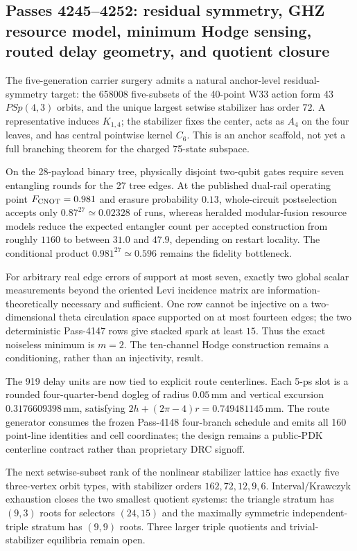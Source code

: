 \subsection*{Passes 4245--4252: residual symmetry, GHZ resource model, minimum Hodge sensing, routed delay geometry, and quotient closure}
The five-generation carrier surgery admits a natural anchor-level residual-symmetry target: the 658008 five-subsets of the 40-point W33 action form 43 $PSp(4,3)$ orbits, and the unique largest setwise stabilizer has order $72$.  A representative induces $K_{1,4}$; the stabilizer fixes the center, acts as $A_4$ on the four leaves, and has central pointwise kernel $C_6$.  This is an anchor scaffold, not yet a full branching theorem for the charged 75-state subspace.

On the 28-payload binary tree, physically disjoint two-qubit gates require seven entangling rounds for the 27 tree edges.  At the published dual-rail operating point $F_{\rm CNOT}=0.981$ and erasure probability $0.13$, whole-circuit postselection accepts only $0.87^{27}\simeq 0.02328$ of runs, whereas heralded modular-fusion resource models reduce the expected entangler count per accepted construction from roughly $1160$ to between $31.0$ and $47.9$, depending on restart locality.  The conditional product $0.981^{27}\simeq0.596$ remains the fidelity bottleneck.

For arbitrary real edge errors of support at most seven, exactly two global scalar measurements beyond the oriented Levi incidence matrix are information-theoretically necessary and sufficient.  One row cannot be injective on a two-dimensional theta circulation space supported on at most fourteen edges; the two deterministic Pass-4147 rows give stacked spark at least $15$.  Thus the exact noiseless minimum is $m=2$.  The ten-channel Hodge construction remains a conditioning, rather than an injectivity, result.

The 919 delay units are now tied to explicit route centerlines.  Each 5-ps slot is a rounded four-quarter-bend dogleg of radius $0.05\,$mm and vertical excursion $0.3176609398\,$mm, satisfying $2h+(2\pi-4)r=0.749481145\,$mm.  The route generator consumes the frozen Pass-4148 four-branch schedule and emits all 160 point-line identities and cell coordinates; the design remains a public-PDK centerline contract rather than proprietary DRC signoff.

The next setwise-subset rank of the nonlinear stabilizer lattice has exactly five three-vertex orbit types, with stabilizer orders $162,72,12,9,6$.  Interval/Krawczyk exhaustion closes the two smallest quotient systems: the triangle stratum has $(9,3)$ roots for selectors $(24,15)$ and the maximally symmetric independent-triple stratum has $(9,9)$ roots.  Three larger triple quotients and trivial-stabilizer equilibria remain open.

